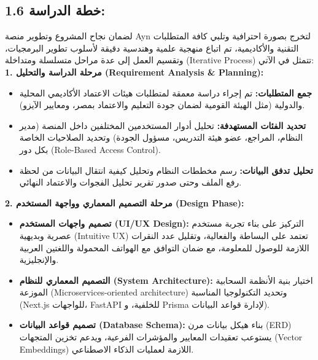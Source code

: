 \documentclass[12pt, a4paper]{report}
\begin{document}
\begin{english}
\section*{1.6 خطة الدراسة:}

لضمان نجاح المشروع وتطوير منصة Ayn لتخرج بصورة احترافية وتلبي كافة المتطلبات التقنية والأكاديمية، تم اتباع منهجية علمية وهندسية دقيقة لأسلوب تطوير البرمجيات، وتقسيم العمل إلى عدة مراحل متسلسلة ومتداخلة (Iterative Process) تتمثل في الآتي: \\

\textbf{1. مرحلة الدراسة والتحليل (Requirement Analysis & Planning):} \\
\begin{itemize}
\item \textbf{جمع المتطلبات:} تم إجراء دراسة معمقة لمتطلبات هيئات الاعتماد الأكاديمي المحلية والدولية (مثل الهيئة القومية لضمان جودة التعليم والاعتماد بمصر، ومعايير الآيزو).
\item \textbf{تحديد الفئات المستهدفة:} تحليل أدوار المستخدمين المختلفين داخل المنصة (مدير النظام، المراجع، عضو هيئة التدريس، مسؤول الجودة) وتحديد الصلاحيات الخاصة بكل دور (Role-Based Access Control).
\item \textbf{تحليل تدفق البيانات:} رسم مخططات النظام وتحليل كيفية انتقال البيانات من لحظة رفع الملف وحتى صدور تقرير تحليل الفجوات والاعتماد النهائي.
\end{itemize}

\textbf{2. مرحلة التصميم المعماري وواجهة المستخدم (Design Phase):} \\
\begin{itemize}
\item \textbf{تصميم واجهات المستخدم (UI/UX Design):} التركيز على بناء تجربة مستخدم عصرية وبديهية (Intuitive UX) تعتمد على البساطة والفعالية، وتقليل عدد النقرات اللازمة للوصول للمعلومة، مع ضمان التوافق مع الهواتف المحمولة واللغتين العربية والإنجليزية.
\item \textbf{التصميم المعماري للنظام (System Architecture):} اختيار بنية الأنظمة السحابية الموزعة (Microservices-oriented architecture) وتحديد التكنولوجيا المناسبة (Next.js للواجهات، FastAPI للخلفية، و Prisma لإدارة قواعد البيانات).
\item \textbf{تصميم قواعد البيانات (Database Schema):} بناء هيكل بيانات مرن (ERD) يستوعب تعقيدات المعايير والمؤشرات الفرعية، ويدعم تخزين المتجهات (Vector Embeddings) اللازمة لعمليات الذكاء الاصطناعي.
\end{itemize}


\end{english}
\end{document}
